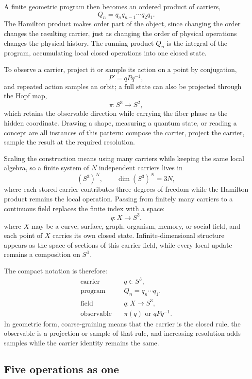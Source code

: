 \documentclass[12pt]{article}
\begin{document}
A finite geometric program then becomes an ordered product of carriers,
\[
    Q_n = q_n q_{n-1}\cdots q_2 q_1.
\]
The Hamilton product makes order part of the object, since changing the order changes the resulting carrier, just as changing the order of physical operations changes the physical history. The running product $Q_n$ is the integral of the program, accumulating local closed operations into one closed state.

To observe a carrier, project it or sample its action on a point by conjugation,
\[
    P' = qPq^{-1},
\]
and repeated action samples an orbit; a full state can also be projected through the Hopf map,
\[
    \pi:S^3\to S^2,
\]
which retains the observable direction while carrying the fiber phase as the hidden coordinate. Drawing a shape, measuring a quantum state, or reading a concept are all instances of this pattern: compose the carrier, project the carrier, sample the result at the required resolution.

Scaling the construction means using many carriers while keeping the same local algebra, so a finite system of $N$ independent carriers lives in
\[
    (S^3)^N,
    \qquad
    \dim (S^3)^N = 3N,
\]
where each stored carrier contributes three degrees of freedom while the Hamilton product remains the local operation. Passing from finitely many carriers to a continuous field replaces the finite index with a space:
\[
    q:X\to S^3.
\]
where $X$ may be a curve, surface, graph, organism, memory, or social field, and each point of $X$ carries its own closed state. Infinite-dimensional structure appears as the space of sections of this carrier field, while every local update remains a composition on $S^3$.

The compact notation is therefore:
\[
    \begin{aligned}
    \text{carrier} \quad &q\in S^3,\\
    \text{program} \quad &Q_n=q_n\cdots q_1,\\
    \text{field} \quad &q:X\to S^3,\\
    \text{observable} \quad &\pi(q)\text{ or }qPq^{-1}.
    \end{aligned}
\]
In geometric form, coarse-graining means that the carrier is the closed rule, the observable is a projection or sample of that rule, and increasing resolution adds samples while the carrier identity remains the same.

\subsection{Five operations as one}
\end{document}

